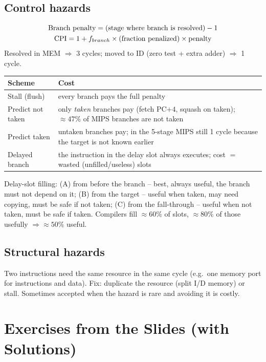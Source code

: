 \documentclass[11pt]{article}
\begin{document}
\subsection{Control hazards}
\begin{prop}
\begin{gather*}
  \text{Branch penalty} = (\text{stage where branch is resolved}) - 1\\
  \mathrm{CPI} = 1 + f_{branch}\times(\text{fraction penalized})\times\text{penalty}
\end{gather*}
Resolved in MEM $\Rightarrow$ 3 cycles; moved to ID (zero test + extra adder)
$\Rightarrow$ 1 cycle.
\end{prop}
\begin{center}
\small
\begin{tabular}{@{}lp{9.6cm}@{}}
\toprule
Scheme & Cost \\
\midrule
Stall (flush) & every branch pays the full penalty \\
Predict not taken & only \emph{taken} branches pay (fetch PC$+4$, squash on taken); $\approx47\%$ of MIPS branches are not taken \\
Predict taken & untaken branches pay; in the 5-stage MIPS still 1 cycle because the target is not known earlier \\
Delayed branch & the instruction in the delay slot always executes; cost $=$ wasted (unfilled/useless) slots \\
\bottomrule
\end{tabular}
\end{center}
Delay-slot filling: (A) from before the branch -- best, always useful, the
branch must not depend on it; (B) from the target -- useful when taken, may
need copying, must be safe if not taken; (C) from the fall-through -- useful
when not taken, must be safe if taken. Compilers fill $\approx60\%$ of slots,
$\approx80\%$ of those usefully $\Rightarrow\approx50\%$ useful.

\subsection{Structural hazards}
Two instructions need the same resource in the same cycle (e.g.\ one memory
port for instructions and data). Fix: duplicate the resource (split I/D
memory) or stall. Sometimes accepted when the hazard is rare and avoiding it
is costly.

\section{Exercises from the Slides (with Solutions)}
\end{document}

